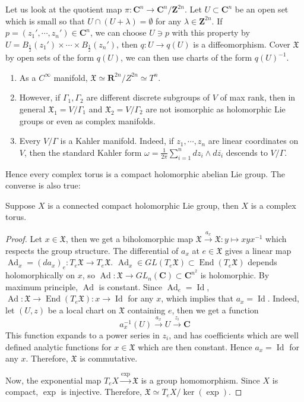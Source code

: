 \documentclass[
11pt, %
letterpaper， %
oneside, %
headinclude,footinclude, %
BCOR5mm, %
]{scrartcl}
\newcommand{\Z}{{\mathbf{Z}}}
\newcommand{\R}{{\mathbf{R}}}
\newcommand{\C}{{\mathbf{C}}}
\newcommand{\End}{\operatorname{End}}
\newcommand{\id}{\operatorname{Id}}
\newcommand{\Ad}{\operatorname{Ad}}
\begin{document}
Let us look at the quotient map $\pi: \C^n \to \C^n/\Z^{2n}$. Let $U\subset \C^n$ be an  open set which is small so that $U\cap (U+\lambda)=\emptyset$ for any $\lambda \in \Z^{2n}$. If $p=(z_1',\cdots, z_n')\in \C^n$, we can choose $U\ni p$ with this property by $U=B_{\frac{1}{2}}(z_1')\times\cdots\times B_{\frac{1}{2}}(z_n')$, then $q: U \to q(U)$ is a diffeomorphism. Cover $\mathfrak{X}$ by open sets of the form $q(U)$, we can then use charts of the form $q(U)^{-1}$.

\begin{rem}
	\begin{enumerate}
		\item As a $C^{\infty}$ manifold, $\mathfrak{X}\simeq \R^{2n}/Z^{2n}\simeq T^n$.
		\item However, if $\Gamma_1, \Gamma_2$ are different discrete subgroups of $V$ of max rank, then in general $\mathfrak{X}_1=V/\Gamma_1$ and  $\mathfrak{X}_2=V/\Gamma_2$ are not isomorphic as holomorphic Lie groups or even as complex manifolds.
		\item Every $V/\Gamma$ is a Kahler manifold. Indeed, if $z_1,\cdots, z_n$ are linear coordinates on $V$, then the standard Kahler form $\omega=\frac{1}{2\pi}\sum_{i=1}^{n} dz_i\wedge d\overline{z_i}$ descends to $V/\Gamma$. 
	\end{enumerate}
\end{rem} 
Hence every complex torus is a compact holomorphic abelian Lie group. The converse is also true:
\begin{lem}
	Suppose $X$ is a connected compact holomorphic Lie group, then $X$ is a complex torus.
\end{lem}
\begin{proof}
	Let $x\in \mathfrak{X}$, then we get a biholomorphic map $\mathfrak{X}\stackrel{a_x}{\to }\mathfrak{X}: y\mapsto xyx^{-1}$ which respects the group structure. The differential of $a_x$ at $e\in \mathfrak{X}$ gives a linear map $\Ad_x=(da_x)_e: T_e\mathfrak{X}\to T_e\mathfrak{X}$. $\Ad_x \in GL(T_e\mathfrak{X})\subset \End(T_e\mathfrak{X})$ depends holomorphically on $x$, so $\Ad: \mathfrak{X} \to GL_n(\C)\subset \C^{n^2}$ is holomorphic. By maximum principle, $\Ad$ is constant. Since $\Ad_e= \id$, $\Ad: \mathfrak{X}\to \End(T_e\mathfrak{X}): x\to \id$ for any $x$, which implies that $a_x=\id$. Indeed, let $(U,z)$ be a local chart on $\mathfrak{X}$ containing $e$, then we get a function
	\begin{equation*}
	a_x^{-1}(U)\stackrel{a_x}{\to}U\stackrel{z_i}{\to } \C
	\end{equation*}
	This function expands to a power series in $z_i$, and has coefficients which are well defined analytic functions for $x\in \mathfrak{X}$ which are then constant. Hence $a_x=\id$ for any $x$. Therefore, $\mathfrak{X}$ is commutative.
	
	Now, the exponential map $T_e X \stackrel{\exp}{\to}\mathfrak{X}$ is a group homomorphism. Since $X$ is compact, $\exp$ is injective. Therefore, $\mathfrak{X}\simeq T_e X/ \ker(\exp)$.
\end{proof}
\end{document}
